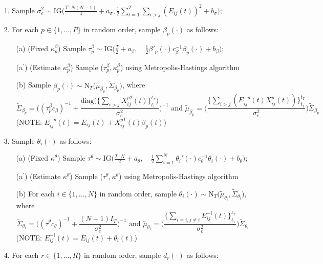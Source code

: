 \documentclass[a4paper]{article}
\begin{document}
	\begin{itemize}
		\item [1.] Sample $\sigma_e^2 \sim \mbox{IG}\big(\frac{T\cdot N(N-1)}{4}+a_\sigma, \frac{1}{2}\sum\limits_{t=1}^T\sum\limits_{i> j}(E_{ij}(t))^2 + b_\sigma\big)$;
		\item [2.] For each $p \in \{1,...,P\}$ in random order, sample $\beta_p(\cdot)$ as follows:
		\begin{enumerate}
			\item [(a)] (Fixed $\kappa^\beta_p$) Sample $\tau^{\beta}_p \sim \mbox{IG}\big(\frac{T}{2}+a_\beta,\quad \frac{1}{2}\beta'_p(\cdot)c_\beta^{-1}\beta_p(\cdot)+b_\beta\big)$; 
					\item [(a$^\prime$)] (Estimate $\kappa^\beta_p$) Sample ($\tau^{\beta}_p ,  \kappa^\beta_p$) using Metropolis-Hastings algorithm
					\item [(b)] Sample $\beta_p(\cdot) \sim \mbox{N}_T\big(\tilde{\mu}_{\beta_p}, \tilde{\Sigma}_{\beta_p} \big)$, where
						$$\tilde{\Sigma}_{\beta_p} = \Big((\tau^{\beta}_pc_\beta)^{-1}+\frac{\mbox{diag}\big(\{\sum_{i>j}{X^{p2}_{ij}}(t)\}_{t_1}^{t_T}\big)}{\sigma_e^2}\Big)^{-1} \mbox{ and } \tilde{\mu}_{\beta_p} =  \Big(\frac{\{\sum_{i>j}(E^{-p}_{ij}(t)X^{p}_{ij}(t))\}_{t_1}^{t_T}}{\sigma_e^2}\Big)\tilde{\Sigma}_{\beta_p}$$ 
						(NOTE: $E^{-p}_{ij}(t)=E_{ij}(t)+X^{pT}_{ij}(t)\beta_p(t)$)						
		\end{enumerate}
		\item [3.] Sample $\theta_i(\cdot)$ as follows:
		\begin{enumerate}
			\item [(a)] (Fixed $\kappa^\theta$) Sample $\tau^{\theta} \sim \mbox{IG}\big(\frac{T\cdot N}{2}+a_\theta,\quad \frac{1}{2}\sum\limits_{i = 1}^{N}\theta_i'(\cdot)c_\theta^{-1}\theta_i(\cdot)+b_\theta\big)$;
							\item [(a$^\prime$)] (Estimate $\kappa^\theta$) Sample ($\tau^{\theta},  \kappa^\theta$) using Metropolis-Hastings algorithm
							\item [(b)] For each $i \in \{1,...,N\}$ in random order, sample $\theta_i(\cdot) \sim \mbox{N}_T\big(\tilde{\mu}_{\theta_i}, \tilde{\Sigma}_{\theta_i} \big)$, where
	$$\tilde{\Sigma}_{\theta_i} = \Big((\tau^\theta c_\theta)^{-1}+\frac{(N-1)I_T}{\sigma_e^2}\Big)^{-1} \mbox{ and }
						\tilde{\mu}_{\theta_i} = \Big(\frac{\{\sum_{i=i, j\neq i}E^{-i}_{ij}(t)\}_{t_1}^{t_T}}{\sigma_e^2}\Big)\tilde{\Sigma}_{\theta_i} $$ (NOTE: $E^{-i}_{ij}(t)=E_{ij}(t)+\theta_i(t)$)
		\end{enumerate}
		\item [4.] For each $r \in \{1,...,R\}$ in random order, sample $d_r(\cdot)$ as follows:

\end{itemize}
\end{document}
